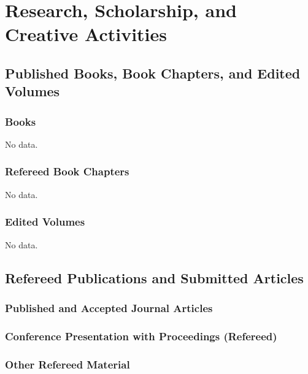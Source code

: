 \section{Research, Scholarship, and Creative Activities}
\begin{adjustwidth}{2em}{0pt}

\subsection{Published Books, Book Chapters, and Edited Volumes}

\subsubsection{Books}
No data.

\subsubsection{Refereed Book Chapters}
No data.

\subsubsection{Edited Volumes}
No data.

\subsection{Refereed Publications and Submitted Articles}

\nocite{*}

\subsubsection{Published and Accepted Journal Articles}

\newrefcontext[labelprefix=J]
\printbibliography[type=article,resetnumbers=true,heading=none]

\subsubsection{Conference Presentation with Proceedings (Refereed)}

\newrefcontext[labelprefix=P]
\printbibliography[type=inproceedings,resetnumbers=true,heading=none]

\subsubsection{Other Refereed Material}


\end{adjustwidth}
